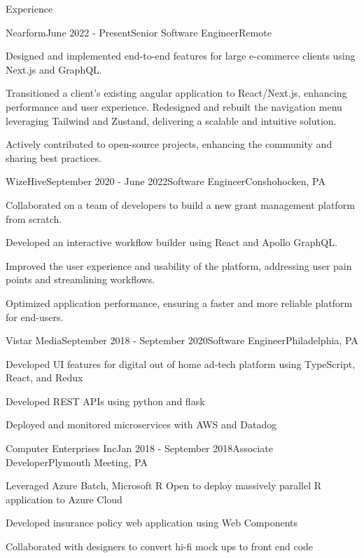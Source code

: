 \documentclass{resume} %
\begin{document}
\begin{rSection}{Experience}

\begin{rSubsection}{Nearform}{June 2022 - Present}{Senior Software Engineer}{Remote}
\item Designed and implemented end-to-end features for large e-commerce clients using Next.js and GraphQL.
\item Transitioned a client’s existing angular application to React/Next.js, enhancing performance and user experience. Redesigned and rebuilt the navigation menu leveraging Tailwind and Zustand, delivering a scalable and intuitive solution.
\item Actively contributed to open-source projects, enhancing the community and sharing best practices.
\end{rSubsection}

\begin{rSubsection}{WizeHive}{September 2020 - June 2022}{Software Engineer}{Conshohocken, PA}
\item Collaborated on a team of developers to build a new grant management platform from scratch.
\item Developed an interactive workflow builder using React and Apollo GraphQL.
\item Improved the user experience and usability of the platform, addressing user pain points and streamlining workflows.
\item Optimized application performance, ensuring a faster and more reliable platform for end-users.
\end{rSubsection}

\begin{rSubsection}{Vistar Media}{September 2018 - September 2020}{Software Engineer}{Philadelphia, PA}
\item Developed UI features for digital out of home ad-tech platform using TypeScript, React, and Redux
\item Developed REST APIs using python and flask
\item Deployed and monitored microservices with AWS and Datadog
\end{rSubsection}

\begin{rSubsection}{Computer Enterprises Inc}{Jan 2018 - September 2018}{Associate Developer}{Plymouth Meeting, PA}
\item Leveraged Azure Batch, Microsoft R Open to deploy massively parallel R application to Azure Cloud
\item Developed insurance policy web application using Web Components
\item Collaborated with designers to convert hi-fi mock ups to front end code
\end{rSubsection}


\end{rSection}
\end{document}
